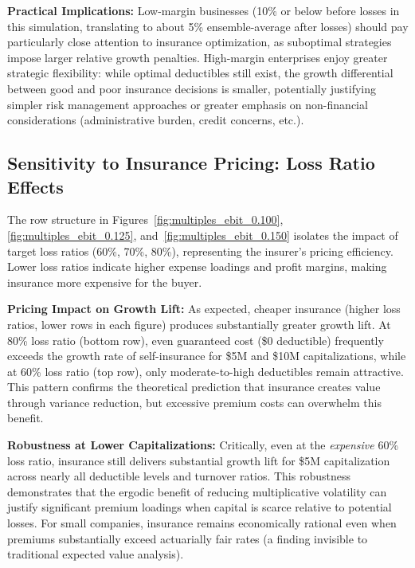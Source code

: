 \documentclass[11pt,letterpaper]{article}
\begin{document}
\vspace{\baselineskip}

\textbf{Practical Implications:} Low-margin businesses (10\% or below before losses in this simulation, translating to about 5\% ensemble-average after losses) should pay particularly close attention to insurance optimization, as suboptimal strategies impose larger relative growth penalties. High-margin enterprises enjoy greater strategic flexibility: while optimal deductibles still exist, the growth differential between good and poor insurance decisions is smaller, potentially justifying simpler risk management approaches or greater emphasis on non-financial considerations (administrative burden, credit concerns, etc.).

\subsection{Sensitivity to Insurance Pricing: Loss Ratio Effects}

The row structure in Figures~\ref{fig:multiples_ebit_0.100}, \ref{fig:multiples_ebit_0.125}, and~\ref{fig:multiples_ebit_0.150} isolates the impact of target loss ratios (60\%, 70\%, 80\%), representing the insurer's pricing efficiency. Lower loss ratios indicate higher expense loadings and profit margins, making insurance more expensive for the buyer.

\vspace{\baselineskip}

\textbf{Pricing Impact on Growth Lift:} As expected, cheaper insurance (higher loss ratios, lower rows in each figure) produces substantially greater growth lift. At 80\% loss ratio (bottom row), even guaranteed cost (\$0 deductible) frequently exceeds the growth rate of self-insurance for \$5M and \$10M capitalizations, while at 60\% loss ratio (top row), only moderate-to-high deductibles remain attractive. This pattern confirms the theoretical prediction that insurance creates value through variance reduction, but excessive premium costs can overwhelm this benefit.

\vspace{\baselineskip}

\textbf{Robustness at Lower Capitalizations:} Critically, even at the \emph{expensive} 60\% loss ratio, insurance still delivers substantial growth lift for \$5M capitalization across nearly all deductible levels and turnover ratios. This robustness demonstrates that the ergodic benefit of reducing multiplicative volatility can justify significant premium loadings when capital is scarce relative to potential losses. For small companies, insurance remains economically rational even when premiums substantially exceed actuarially fair rates (a finding invisible to traditional expected value analysis).
\end{document}
